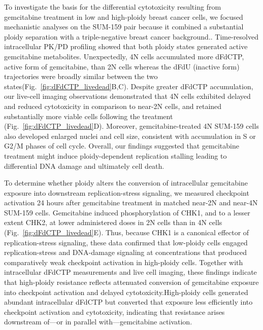 \documentclass[11pt,notitlepage]{article}
\begin{document}
To investigate the basis for the differential cytotoxicity resulting from gemcitabine treatment in low and high-ploidy breast cancer cells, we focused mechanistic analyses on the SUM-159 pair because it combined a substantial ploidy separation with a triple-negative breast cancer background.. Time-resolved intracellular PK/PD profiling showed that both ploidy states generated active gemcitabine metabolites. Unexpectedly, 4N cells accumulated more dFdCTP, active form of gemcitabine, than 2N cells whereas the dFdU (inactive form) trajectories were broadly similar between the two states(Fig.~\ref{fig:dFdCTP_livedead}B,C). Despite greater dFdCTP accumulation, our live-cell imaging observations demonstrated that 4N cells exhibited
  delayed and reduced cytotoxicity in comparison to near-2N cells, and retained substantially more viable cells following the treatment (Fig.~\ref{fig:dFdCTP_livedead}D). Moreover, gemcitabine-treated 4N SUM-159 cells also developed enlarged nuclei and cell size, consistent with accumulation in S or G2/M phases of cell cycle. Overall, our findings suggested that gemcitabine treatment might induce ploidy-dependent replication stalling leading to differential DNA damage and ultimately cell death.
  
To determine whether ploidy alters the conversion of intracellular gemcitabine exposure into downstream replication-stress signaling, we measured checkpoint activation 24 hours after gemcitabine treatment in matched near-2N and near-4N SUM-159 cells. Gemcitabine induced phosphorylation of CHK1, and to a lesser extent CHK2, at lower administered doses in 2N cells than in 4N cells (Fig.~\ref{fig:dFdCTP_livedead}E). Thus, because CHK1 is a canonical effector of replication-stress signaling, these data confirmed that low-ploidy cells engaged replication-stress and DNA-damage signaling at concentrations that produced comparatively weak checkpoint activation in high-ploidy cells. Together with intracellular dFdCTP measurements and live cell imaging, these findings indicate that high-ploidy resistance reflects attenuated conversion of gemcitabine exposure into checkpoint activation and delayed cytotoxicity.High-ploidy cells generated abundant intracellular dFdCTP but converted that exposure less efficiently into checkpoint activation and cytotoxicity, indicating that resistance arises downstream of—or in parallel with—gemcitabine activation. 
\end{document}
